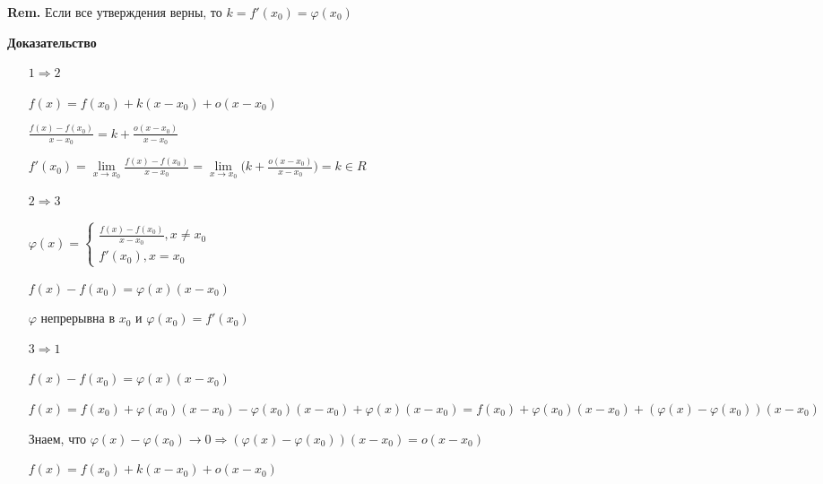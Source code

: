 \documentclass[14pt, letter paper]{article}
\begin{document}
\textbf{Rem.} Если все утверждения верны, то $k = f'(x_0) = \varphi(x_0)$

\begin{center}
    \textbf{Доказательство}
\end{center}

\begin{itemize}
    \item[$1 \Rightarrow 2$]

    $f(x) = f(x_0) + k(x - x_0) + o(x - x_0)$

    $\frac{f(x) - f(x_0)}{x-x_0} = k + \frac{o(x-x_0)}{x - x_0}$

    $f'(x_0) = \lim\limits_{x \rightarrow x_0}{\frac{f(x)-f(x_0)}{x-x_0}} = \lim\limits_{x \rightarrow x_0}{(k + \frac{o(x-x_0)}{x-x_0}}) = k \in R$

    \item[$2 \Rightarrow 3$]

    $\varphi(x) = \begin{cases}
        \frac{f(x)-f(x_0)}{x-x_0}, x \neq x_0 \\
        f'(x_0), x = x_0
    \end{cases}$

    $f(x)-f(x_0) = \varphi(x)(x-x_0)$

    $\varphi$ непрерывна в $x_0$ и $\varphi(x_0) = f'(x_0)$

    \item[$3 \Rightarrow 1$]

    $f(x) - f(x_0) = \varphi(x)(x-x_0)$

    $f(x) = f(x_0) + \varphi(x_0)(x-x_0) - \varphi(x_0)(x-x_0) + \varphi(x)(x-x_0) = f(x_0) + \varphi(x_0)(x-x_0) + (\varphi(x) - \varphi(x_0))(x-x_0)$

    Знаем, что $\varphi(x) - \varphi(x_0) \rightarrow 0 \Rightarrow (\varphi(x) - \varphi(x_0))(x-x_0) = o(x-x_0)$

    $f(x) = f(x_0) + k(x-x_0) + o(x-x_0)$
\end{itemize}
\end{document}
